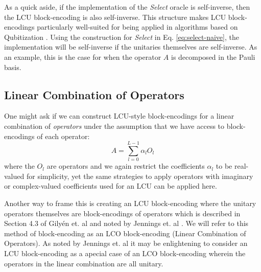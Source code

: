 As a quick aside, if the implementation of the \textit{Select} oracle is self-inverse, then the LCU block-encoding is also self-inverse.
This structure makes LCU block-encodings particularly well-suited for being applied in algorithms based on Qubitization \cite{low2019hamiltonian}.
Using the construction for \textit{Select} in Eq. \ref{eq:select-naive}, the implementation will be self-inverse if the unitaries themselves are self-inverse.
As an example, this is the case for when the operator $A$ is decomposed in the Pauli basis.

\subsection{Linear Combination of Operators}
\label{subsec:lco}

One might ask if we can construct LCU-style block-encodings for a linear combination of \textit{operators} under the assumption that we have access to block-encodings of each operator:
\begin{equation}
    \label{eq:lco}
    A = \sum_{l=0}^{L-1} \alpha_l O_l
\end{equation}
where the $O_l$ are operators and we again restrict the coefficients $\alpha_l$ to be real-valued for simplicity, yet the same strategies to apply operators with imaginary or complex-valued coefficients used for an LCU can be applied here.

Another way to frame this is creating an LCU block-encoding where the unitary operators themselves are block-encodings of operators which is described in Section 4.3 of Gilyén et. al \cite{gilyen2019quantum} and noted by Jennings et. al \cite{jennings2023efficient}.
We will refer to this method of block-encoding as an LCO block-encoding (Linear Combination of Operators).
As noted by Jennings et. al \cite{jennings2023efficient} it may be enlightening to consider an LCU block-encoding as a apecial case of an LCO block-encoding wherein the operators in the linear combination are all unitary.

